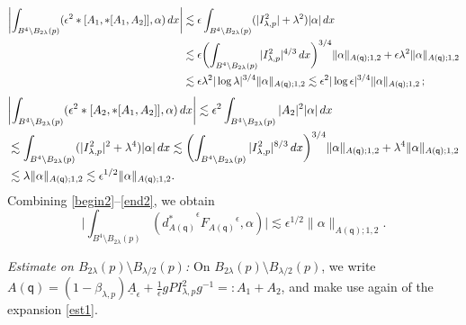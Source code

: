 \documentclass[11pt]{article}
\numberwithin{equation}{section} \setlength{\topmargin}{-35pt}
\newcommand{\q}{\mathsf{q}}
\begin{document}
\begin{align}
\biggl|\int_{B^4\setminus
B_{2\lambda}(p)}(\epsilon^2\ast[A_1,\ast[A_1,A_2]],\alpha)\,dx\biggr|
&\lesssim\epsilon\int_{B^4\setminus B_{2\lambda}(p)}(|I^2_{\lambda,p}|+\lambda^2)|\alpha|\,dx\notag\\
&\lesssim\epsilon\biggl(\int_{B^4\setminus
B_{2\lambda}(p)}|I^2_{\lambda,p}|^{4/3}\,dx\biggr)^{3/4}\|\alpha\|_{A(\q);1,2}+
 \epsilon\lambda^2\|\alpha\|_{A(\q);1,2}\notag\\
&\lesssim\epsilon\lambda^2|\log\lambda|^{3/4}\|\alpha\|_{A(\q);1,2}\lesssim\epsilon^2|\log\epsilon|^{3/4}\|\alpha\|_{A(\q);1,2}\,;
\end{align}
\begin{align}
\label{end2}&\biggl|\int_{B^4\setminus
B_{2\lambda}(p)}(\epsilon^2\ast[A_2,\ast[A_1,A_2]],\alpha)\,dx\biggr|
\lesssim\epsilon^2\int_{B^4\setminus B_{2\lambda}(p)}|A_2|^2|\alpha|\,dx\notag\\
&\lesssim\int_{B^4\setminus
B_{2\lambda}(p)}(|I^2_{\lambda,p}|^2+\lambda^4)|\alpha|\,dx
 \lesssim\biggl(\int_{B^4\setminus B_{2\lambda}(p)}|I^2_{\lambda,p}|^{8/3}\,dx\biggr)^{3/4}\|\alpha\|_{A(\q);1,2}+
 \lambda^4\|\alpha\|_{A(\q);1,2}\notag\\
&\lesssim\lambda\|\alpha\|_{A(\q);1,2}\lesssim\epsilon^{1/2}\|\alpha\|_{A(\q);1,2}.
\end{align}
Combining \eqref{begin2}--\eqref{end2}, we obtain
\begin{equation}
\label{est2} \biggl|\int_{B^4\setminus
B_{2\lambda}(p)}({d_{A(\q)}^{\ast}}^{\epsilon}{F_{A(\q)}}^{\epsilon},\alpha)
\biggr|\lesssim\epsilon^{1/2}\|\alpha\|_{A(\q);1,2}.
\end{equation}

\medskip

\textit{Estimate on $B_{2\lambda}(p)\setminus B_{\lambda/2}(p)$:} On
$B_{2\lambda}(p)\setminus B_{\lambda/2}(p)$, we write
$A(\q)=(1-\beta_{\lambda,p})\underline{A}_{\epsilon}+\frac{1}{\epsilon}gPI^2_{\lambda,p}g^{-1}=:A_1+A_2$,
and make use again of the expansion \eqref{est1}.
\end{document}
